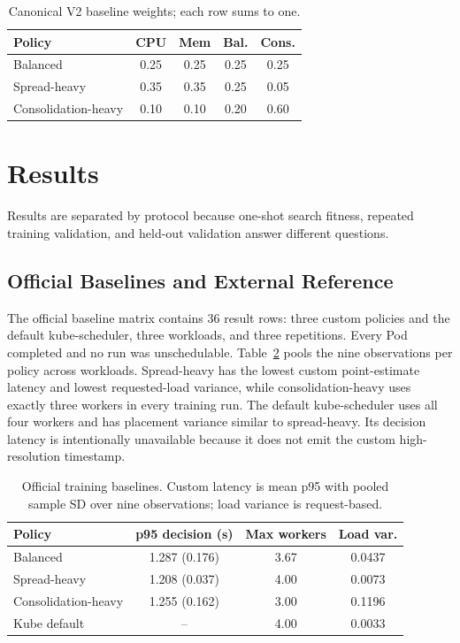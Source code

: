 \documentclass[conference]{IEEEtran}
\begin{document}
\begin{table}[t]
\caption{Canonical V2 baseline weights; each row sums to one.}
\label{tab:baseline-weights}
\centering
\scriptsize
\begin{tabular}{lcccc}
\toprule
Policy & CPU & Mem & Bal. & Cons. \\
\midrule
Balanced & 0.25 & 0.25 & 0.25 & 0.25 \\
Spread-heavy & 0.35 & 0.35 & 0.25 & 0.05 \\
Consolidation-heavy & 0.10 & 0.10 & 0.20 & 0.60 \\
\bottomrule
\end{tabular}
\end{table}

\section{Results}
Results are separated by protocol because one-shot search fitness, repeated training validation, and held-out validation answer different questions.

\subsection{Official Baselines and External Reference}
The official baseline matrix contains 36 result rows: three custom policies and the default kube-scheduler, three workloads, and three repetitions. Every Pod completed and no run was unschedulable. Table~\ref{tab:baseline-results} pools the nine observations per policy across workloads. Spread-heavy has the lowest custom point-estimate latency and lowest requested-load variance, while consolidation-heavy uses exactly three workers in every training run. The default kube-scheduler uses all four workers and has placement variance similar to spread-heavy. Its decision latency is intentionally unavailable because it does not emit the custom high-resolution timestamp.

\begin{table}[t]
\caption{Official training baselines. Custom latency is mean p95 with pooled sample SD over nine observations; load variance is request-based.}
\label{tab:baseline-results}
\centering
\scriptsize
\begin{tabular}{lccc}
\toprule
Policy & p95 decision (s) & Max workers & Load var. \\
\midrule
Balanced & 1.287 (0.176) & 3.67 & 0.0437 \\
Spread-heavy & 1.208 (0.037) & 4.00 & 0.0073 \\
Consolidation-heavy & 1.255 (0.162) & 3.00 & 0.1196 \\
Kube default & -- & 4.00 & 0.0033 \\
\bottomrule
\end{tabular}
\end{table}
\end{document}
